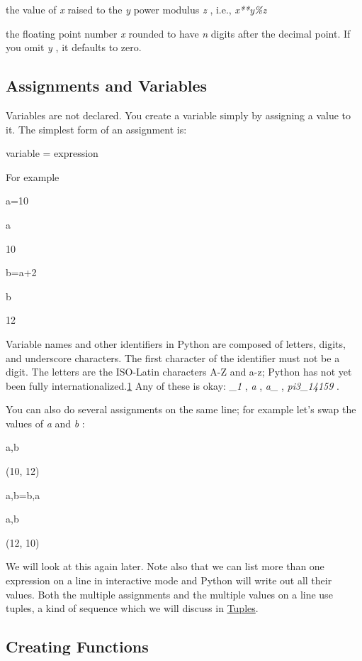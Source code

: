  the value of
\emph{x} raised to the \emph{y} power modulus \emph{z} , i.e.,
\emph{x**y\%z}



 the floating
point number \emph{x} rounded to have \emph{n} digits after the decimal
point. If you omit \emph{y} , it defaults to zero.

\subsection{Assignments and Variables}
\label{assignments-and-variables}

Variables are not declared. You
create a variable simply by assigning a value to it. The simplest form
of an assignment is:

variable = expression

For example


a=10


a

10


b=a+2


b

12

Variable names and other
identifiers in Python are composed of letters, digits, and underscore
characters. The first character of the identifier must not be a digit.
The letters are the ISO-Latin characters A-Z and a-z; Python has not yet
been fully internationalized.\protect\hyperlink{pgfId-115789}{1} Any of
these is okay: \emph{\_1} , \emph{a} , \emph{a\_} , \emph{pi3\_14159} .

You can also do several assignments
on the same line; for example let's swap the values of \emph{a} and
\emph{b} :


a,b

(10, 12)


a,b=b,a


a,b

(12, 10)

We will look at this again later.
Note also that we can list more than one expression on a line in
interactive mode and Python will write out all their values. Both the
multiple assignments and the multiple values on a line use tuples, a
kind of sequence which we will discuss in
\href{chap2.html\#92836}{Tuples}.

\subsection{Creating Functions}
\label{creating-functions}

